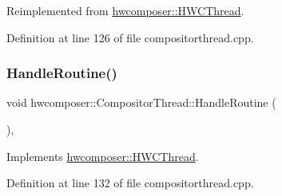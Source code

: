 Reimplemented from \mbox{\hyperlink{classhwcomposer_1_1HWCThread_a39a94bd0b12451fe3060729787921cbf}{hwcomposer\+::\+H\+W\+C\+Thread}}.



Definition at line 126 of file compositorthread.\+cpp.


\begin{DoxyCode}{0}
\end{DoxyCode}
\mbox{\label{classhwcomposer_1_1CompositorThread_af80e4eb7864b2f83a1eaa266a17b3a28}} 
\subsubsection{\texorpdfstring{Handle\+Routine()}{HandleRoutine()}}
{\footnotesize\ttfamily void hwcomposer\+::\+Compositor\+Thread\+::\+Handle\+Routine (\begin{DoxyParamCaption}{ }\end{DoxyParamCaption})\hspace{0.3cm}{\ttfamily [override]}, {\ttfamily [virtual]}}



Implements \mbox{\hyperlink{classhwcomposer_1_1HWCThread_a539ea080e6bf0e6cffe08e2341be1ee4}{hwcomposer\+::\+H\+W\+C\+Thread}}.



Definition at line 132 of file compositorthread.\+cpp.



